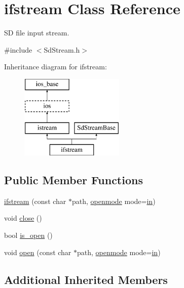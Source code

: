 \hypertarget{classifstream}{}\section{ifstream Class Reference}
\label{classifstream}


SD file input stream.  




{\ttfamily \#include $<$Sd\+Stream.\+h$>$}

Inheritance diagram for ifstream\+:\begin{figure}[H]
\begin{center}
\leavevmode
\includegraphics[height=4.000000cm]{classifstream}
\end{center}
\end{figure}
\subsection*{Public Member Functions}
\begin{DoxyCompactItemize}
\item 
\hyperlink{classifstream_a11f4bfaa5c37cfcf8878c367fd861a88}{ifstream} (const char $\ast$path, \hyperlink{classios__base_aaa192ec0dccc43050715553a34644523}{openmode} mode=\hyperlink{classios__base_ae5432e3c269064480652c4602f5f74ad}{in})
\item 
void \hyperlink{classifstream_ac5892f472afdef6160f5fe2401b16dce}{close} ()
\item 
bool \hyperlink{classifstream_aaa16c6422ea371995d02159f2e6707b2}{is\+\_\+open} ()
\item 
void \hyperlink{classifstream_a169694d6535fd551fd6db48a2867590e}{open} (const char $\ast$path, \hyperlink{classios__base_aaa192ec0dccc43050715553a34644523}{openmode} mode=\hyperlink{classios__base_ae5432e3c269064480652c4602f5f74ad}{in})
\end{DoxyCompactItemize}
\subsection*{Additional Inherited Members}


